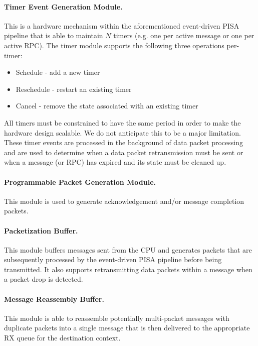 \paragraph{Timer Event Generation Module.}
This is a hardware mechanism within the aforementioned event-driven PISA pipeline that is able to maintain $N$ timers (e.g. one per active message or one per active RPC).
The timer module supports the following three operations per-timer:
\begin{itemize}
    \item Schedule - add a new timer
    \item Reschedule - restart an existing timer
    \item Cancel - remove the state associated with an existing timer
\end{itemize}
All timers must be constrained to have the same period in order to make the hardware design scalable.
We do not anticipate this to be a major limitation.
These timer events are processed in the background of data packet processing and are used to determine when a data packet retransmission must be sent or when a message (or RPC) has expired and its state must be cleaned up.

\paragraph{Programmable Packet Generation Module.}
This module is used to generate acknowledgement and/or message completion packets.

\paragraph{Packetization Buffer.}
This module buffers messages sent from the CPU and generates packets that are subsequently processed by the event-driven PISA pipeline before being transmitted.
It also supports retransmitting data packets within a message when a packet drop is detected.

\paragraph{Message Reassembly Buffer.}
This module is able to reassemble potentially multi-packet messages with duplicate packets into a single message that is then delivered to the appropriate RX queue for the destination context.